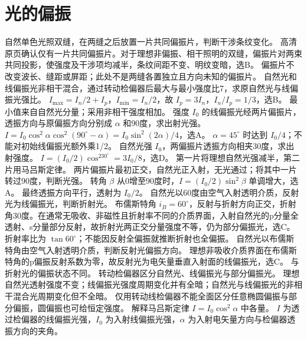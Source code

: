 \section{光的偏振}
\problemtext 自然单色光照双缝，在两缝之后放置一片共同偏振片，判断干涉条纹变化。
\workings 高清原页确认仅有一片共同偏振片。对于理想非偏振、相干照明的双缝，偏振片对两束共同投影，使强度及干涉项均减半，条纹间距不变、明纹变暗，选B。
\crosscheck 偏振片不改变波长、缝距或屏距；此处不是两缝各置独立且方向未知的偏振片。
\problemtext 自然光和线偏振光非相干混合，通过转动检偏器后最大与最小强度比7，求原自然光与线偏振光强比。
\workings $I_{\max}=I_n/2+I_p$，$I_{\min}=I_n/2$，故 $I_p=3I_n$，$I_n/I_p=1/3$，选B。
\crosscheck 最小值来自自然光分量；采用非相干强度相加。
\problemtext 强度 $I_0$ 的线偏振光经两片偏振片，透振方向与原偏振方向分别成 $\alpha$ 和90度，求出射光强。
\workings $I=I_0\cos^2\alpha\cos^2(90^\circ-\alpha)=I_0\sin^2(2\alpha)/4$，选A。
\crosscheck $\alpha=45^\circ$ 时达到 $I_0/4$；不能对初始线偏振光额外乘1/2。
\problemtext 自然光强 $I_0$，两偏振片透振方向相夹30度，求出射强度。
\workings $I=(I_0/2)\cos^230^\circ=3I_0/8$，选D。
\crosscheck 第一片将理想自然光强减半，第二片用马吕斯定律。
\problemtext 两片偏振片最初正交，自然光正入射，无光通过；将其中一片转过90度，判断光强。
\workings 转角 $\beta$ 从0增至90度时，$I=(I_0/2)\sin^2\beta$ 单调增大，选A。
\crosscheck 最终透振方向平行，透射为 $I_0/2$。
\problemtext 自然光以60度由空气入射透明介质，反射光为线偏振光，判断折射光。
\workings 布儒斯特角 $i_B=60^\circ$，反射与折射方向正交，折射角30度。在通常无吸收、非磁性且折射率不同的介质界面，入射自然光的p分量全透射、s分量部分反射，故折射光两正交分量强度不等，仍为部分偏振光，选C。
\crosscheck 折射率比为 $\tan60^\circ$；不能因反射全偏振就推断折射也全偏振。
\problemtext 自然光以布儒斯特角由空气入射透明介质，判断反射光偏振方向。
\workings 理想非吸收介质界面在布儒斯特角的p偏振反射系数为零，故反射光为电矢量垂直入射面的线偏振光，选C。
\crosscheck 与折射光的偏振状态不同。
\problemtext 转动检偏器区分自然光、线偏振光与部分偏振光。
\workings 理想自然光透射强度不变；线偏振光强度周期变化并有全暗；自然光与线偏振光的非相干混合光周期变化但不全暗。
\crosscheck 仅用转动线检偏器不能全面区分任意椭圆偏振与部分偏振，圆偏振也可给恒定强度。
\problemtext 解释马吕斯定律 $I=I_0\cos^2\alpha$ 中各量。
\workings $I$ 为透过检偏器的线偏振光强，$I_0$ 为入射线偏振光强，$\alpha$ 为入射电矢量方向与检偏器透振方向的夹角。
